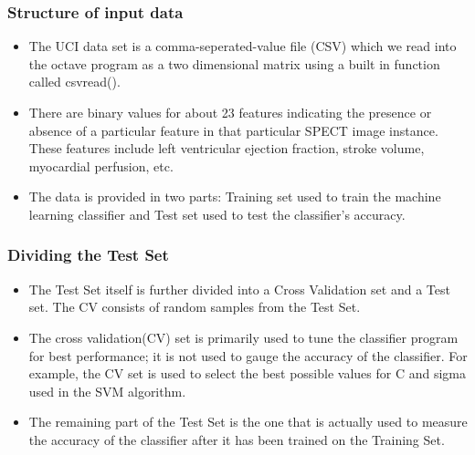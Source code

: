 \documentclass[11pt,xcolor=dvipsnames]{beamer}
\begin{document}
\begin{frame}
\frametitle{Structure of input data}	
\begin{itemize}
\item The UCI data set is a comma-seperated-value file (CSV) which we read into the octave program as a two dimensional matrix using a built in function called csvread(). \\
\item There are binary values for about 23 features indicating the presence or absence of a particular feature in that particular SPECT image instance. These features include left ventricular ejection fraction, stroke volume, myocardial perfusion, etc. \\
\item The data is provided in two parts: {\color{PineGreen}Training set} used to train the machine learning classifier and {\color{PineGreen}Test set} used to test the classifier's accuracy.
\end{itemize}
\end{frame}



\begin{frame}
\frametitle{Dividing the Test Set}	
\begin{itemize}
\item The Test Set itself is further divided into a {\color{PineGreen}Cross Validation set} and a {\color{PineGreen}Test set}. The CV consists of random samples from the Test Set. \\
\item The cross validation(CV) set is primarily used to tune the classifier program for best performance; it is not used to gauge the accuracy of the classifier. For example, the CV set is used to select the best possible values for C and sigma used in the SVM algorithm.\\
\item The remaining part of the Test Set is the one that is actually used to measure the accuracy of the classifier after it has been trained on the Training Set.
\end{itemize}
\end{frame}
\end{document}
